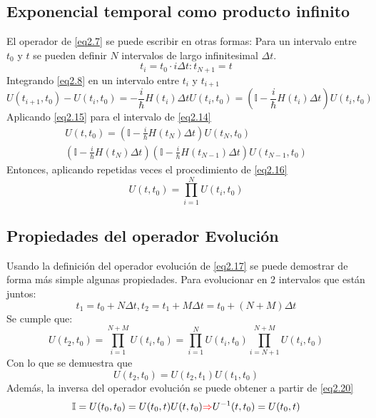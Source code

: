 \documentclass{book}
\begin{document}
\subsection{{Exponencial temporal como producto infinito}}
El operador de \ref{eq2.7} se puede escribir en otras formas: Para un intervalo entre $t_0$ y $t$ se pueden definir $N$ intervalos de largo  infinitesimal $\Delta t$.
\begin{equation} \label{eq2.14} t_i= t_0\cdot i\Delta t: t_{N+1}=t\end{equation}
Integrando \ref{eq2.8} en un intervalo entre $t_i$ y $t_{i+1}$ 
\begin{equation}\label{eq2.15}U(t_{i+1},t_0)-U(t_i,t_0)=-\frac{i}{\hslash}H(t_i)\Delta t U(t_i,t_0)=(\mathbb{I}-\frac{i}{\hbar}H(t_i)\Delta t)U(t_i,t_0)\end{equation}
Aplicando \ref{eq2.15} para el intervalo de \ref{eq2.14}
\begin{equation}\label{eq2.16}\begin{aligned}U(t,t_0)=(\mathbb{I}-\frac{i}{\hbar}H(t_N)\Delta t)U(t_N,t_0) \\ (\mathbb{I}-\frac{i}{\hbar}H(t_N)\Delta t)(\mathbb{I}-\frac{i}{\hbar}H(t_{N-1})\Delta t)U(t_{N-1},t_0)\end{aligned}\end{equation}
Entonces, aplicando repetidas veces el procedimiento de \ref{eq2.16}
\begin{equation}\label{eq2.17}U(t,t_0)=\prod_{i=1}^N U(t_i,t_0)\end{equation}
\subsection{Propiedades del operador Evolución}
Usando la definición del operador evolución de \ref{eq2.17} se puede demostrar de forma más simple algunas propiedades. Para evolucionar en 2 intervalos que están juntos:
\begin{equation}\label{eq2.18}t_1=t_0+N\Delta t, t_2=t_1+M\Delta t= t_0+(N+M)\Delta t\end{equation}
Se cumple que:
\begin{equation}\label{eq2.19}U(t_2,t_0)=\prod_{i=1}^{N+M} U(t_i,t_0)=\prod_{i=1}^{N} U(t_i,t_0)\prod_{i=N+1}^{N+M} U(t_i,t_0)\end{equation}
Con lo que se demuestra que
\begin{equation}\label{eq2.20}U(t_2,t_0)=U(t_2,t_1)U(t_1,t_0)\end{equation}
Además, la inversa del operador evolución se puede obtener a partir  de \ref{eq2.20}
\begin{equation}\label{eq2.21}\mathbb{I}=U(t_0,t_0)=U(t_0,t)U(t,t_0) \textcolor{red}{\Rightarrow} U^{-1}(t,t_0)=U(t_0,t)\end{equation}
\end{document}
